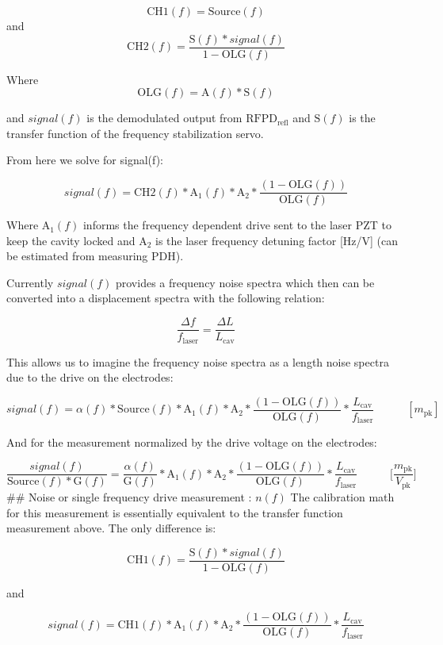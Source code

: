 \[\mathrm{CH1}(f) = \mathrm{Source}(f)\] and
\[\mathrm{CH2}(f) = \frac{\mathrm{S}(f)* signal(f)}{1-\mathrm{OLG}(f)}\]

Where \[\mathrm{OLG}(f) = \mathrm{A}(f)* \mathrm{S}(f)\]

and \(signal(f)\) is the demodulated output from
\(\mathrm{RFPD}_\mathrm{refl}\) and \(\mathrm{S}(f)\) is the transfer
function of the frequency stabilization servo.

From here we solve for signal(f):

\[signal(f) = \mathrm{CH2}(f) * \mathrm{A}_{1}(f) * \mathrm{A}_2* \frac{(1-\mathrm{OLG}(f))}{\mathrm{OLG}(f)}\]

Where \(\mathrm{A}_{1}(f)\) informs the frequency dependent drive sent
to the laser PZT to keep the cavity locked and \(\mathrm{A}_2\) is the
laser frequency detuning factor {[}Hz/V{]} (can be estimated from
measuring PDH).

Currently \(signal(f)\) provides a frequency noise spectra which then
can be converted into a displacement spectra with the following
relation:

\[\frac{\Delta f}{f_\mathrm{laser}} = \frac{\Delta L}{L_\mathrm{cav}}\]

This allows us to imagine the frequency noise spectra as a length noise
spectra due to the drive on the electrodes:

\[signal(f) = \alpha(f)* \mathrm{Source}(f) * \mathrm{A}_{1}(f) * \mathrm{A}_2* \frac{(1-\mathrm{OLG}(f))}{\mathrm{OLG}(f)} * \frac{L_\mathrm{cav}}{f_\mathrm{laser}}\hspace{35pt} [m_\mathrm{pk}]\]

And for the measurement normalized by the drive voltage on the
electrodes:

\[\frac{signal(f)}{\mathrm{Source}(f) * \mathrm{G}(f)} = \frac{\alpha(f)}{\mathrm{G}(f)} * \mathrm{A}_{1}(f) * \mathrm{A}_2* \frac{(1-\mathrm{OLG}(f))}{\mathrm{OLG}(f)} * \frac{L_\mathrm{cav}}{f_\mathrm{laser}}\hspace{35pt} \bigg[\frac{m_\mathrm{pk}}{V_\mathrm{pk}}\bigg]\]
\#\# Noise or single frequency drive measurement : \(n(f)\) The
calibration math for this measurement is essentially equivalent to the
transfer function measurement above. The only difference is:

\[\mathrm{CH1}(f) = \frac{\mathrm{S}(f)* signal(f)}{1-\mathrm{OLG}(f)}\]

and

\[signal(f) = \mathrm{CH1}(f) * \mathrm{A}_{1}(f) * \mathrm{A}_2* \frac{(1-\mathrm{OLG}(f))}{\mathrm{OLG}(f)} * \frac{L_\mathrm{cav}}{f_\mathrm{laser}}\]

